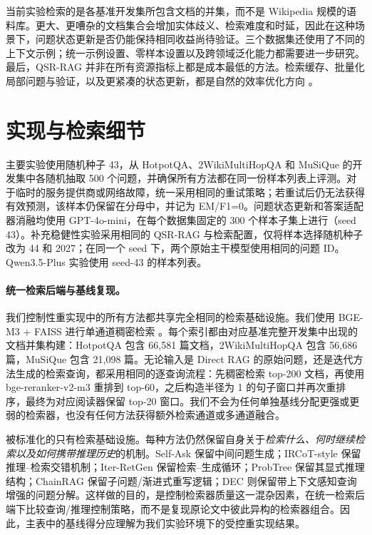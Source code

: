 \documentclass[11pt]{article}
\begin{document}
	当前实验检索的是各基准开发集所包含文档的并集，而不是 Wikipedia 规模的语料库。更大、更嘈杂的文档集合会增加实体歧义、检索难度和时延，因此在这种场景下，问题状态更新是否仍能保持相同收益尚待验证。三个数据集还使用了不同的上下文示例；统一示例设置、零样本设置以及跨领域泛化能力都需要进一步研究。最后，QSR-RAG 并非在所有资源指标上都是成本最低的方法。检索缓存、批量化局部问题与验证，以及更紧凑的状态更新，都是自然的效率优化方向 \citep{yang2026compact}。

	

	\makeatletter
	\setlength{\@dblfptop}{0pt}
	\setlength{\@dblfpsep}{12pt}
	\setlength{\@dblfpbot}{0pt plus 1fil}
	\makeatother
	\appendix

	\section{实现与检索细节}
	\label{app:implementation}

	主要实验使用随机种子 43，从 HotpotQA、2WikiMultiHopQA 和 MuSiQue 的开发集中各随机抽取 500 个问题，并确保所有方法都在同一份样本列表上评测。对于临时的服务提供商或网络故障，统一采用相同的重试策略；若重试后仍无法获得有效预测，该样本仍保留在分母中，并记为 EM/F1=0。问题状态更新和答案适配器消融均使用 GPT-4o-mini，在每个数据集固定的 300 个样本子集上进行（seed 43）。补充稳健性实验采用相同的 QSR-RAG 与检索配置，仅将样本选择随机种子改为 44 和 2027；在同一个 seed 下，两个原始主干模型使用相同的问题 ID。Qwen3.5-Plus 实验使用 seed-43 的样本列表。

	\paragraph{统一检索后端与基线复现。}
	我们控制性重实现中的所有方法都共享完全相同的检索基础设施。我们使用 BGE-M3 + FAISS 进行单通道稠密检索 \citep{chen2024bgem3,johnson2021faiss}。每个索引都由对应基准完整开发集中出现的文档并集构建：HotpotQA 包含 66,581 篇文档，2WikiMultiHopQA 包含 56,686 篇，MuSiQue 包含 21,098 篇。无论输入是 Direct RAG 的原始问题，还是迭代方法生成的检索查询，都采用相同的逐查询流程：先稠密检索 top-200 文档，再使用 bge-reranker-v2-m3 重排到 top-60，之后构造半径为 1 的句子窗口并再次重排序，最终为对应阅读器保留 top-20 窗口。我们不会为任何单独基线分配更强或更弱的检索器，也没有任何方法获得额外检索通道或多通道融合。

	被标准化的只有检索基础设施。每种方法仍然保留自身关于\emph{检索什么、何时继续检索以及如何携带推理历史}的机制。Self-Ask 保留中间问题生成；IRCoT-style 保留推理--检索交错机制；Iter-RetGen 保留检索--生成循环；ProbTree 保留其显式推理结构；ChainRAG 保留子问题/渐进式重写逻辑；DEC 则保留带上下文感知查询增强的问题分解。这样做的目的，是控制检索器质量这一混杂因素，在统一检索后端下比较查询/推理控制策略，而不是复现原论文中彼此异构的检索器组合。因此，主表中的基线得分应理解为我们实验环境下的受控重实现结果。
\end{document}
